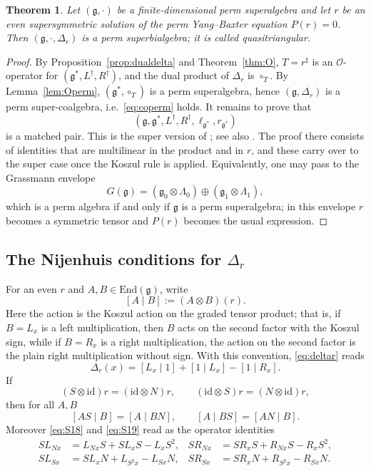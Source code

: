 \documentclass[11pt]{article}
\newtheorem{theorem}{Theorem}[section]
\theoremstyle{definition}
\newcommand{\g}{\mathfrak{g}}
\newcommand{\id}{\mathrm{id}}
\newcommand{\End}{\mathrm{End}}
\begin{document}
\begin{theorem}\label{thm:coboundary}
Let $(\g,\cdot)$ be a finite-dimensional perm superalgebra and let $r$ be an even supersymmetric solution of the perm Yang--Baxter equation $P(r)=0$. Then $(\g,\cdot,\Delta_r)$ is a perm superbialgebra; it is called \emph{quasitriangular}.
\end{theorem}
\begin{proof}
By Proposition~\ref{prop:dualdelta} and Theorem~\ref{thm:O}, $T=r^\sharp$ is an $\mathcal O$-operator for $(\g^*,L^\dagger,R^\dagger)$, and the dual product of $\Delta_r$ is $\circ_T$. By Lemma~\ref{lem:Operm}, $(\g^*,\circ_T)$ is a perm superalgebra, hence $(\g,\Delta_r)$ is a perm super-coalgebra, i.e.\ \eqref{eq:coperm} holds. It remains to prove that
\[
(\g,\g^*,L^\dagger,R^\dagger,\ell_{\g^*},r_{\g^*})
\]
is a matched pair. This is the super version of \cite[Cor.~4.15]{Hou}; see also \cite{MS}. The proof there consists of identities that are multilinear in the product and in $r$, and these carry over to the super case once the Koszul rule is applied. Equivalently, one may pass to the Grassmann envelope
\[
G(\g)=(\g_0\otimes\Lambda_0)\oplus(\g_1\otimes\Lambda_1),
\]
which is a perm algebra if and only if $\g$ is a perm superalgebra; in this envelope $r$ becomes a symmetric tensor and $P(r)$ becomes the usual expression.
\end{proof}

\subsection{The Nijenhuis conditions for $\Delta_r$}

For an even $r$ and $A,B\in\End(\g)$, write
\[
[A\mid B]:=(A\otimes B)(r).
\]
Here the action is the Koszul action on the graded tensor product; that is, if $B=L_x$ is a left multiplication, then $B$ acts on the second factor with the Koszul sign, while if $B=R_x$ is a right multiplication, the action on the second factor is the plain right multiplication without sign. With this convention, \eqref{eq:deltar} reads
\[
\Delta_r(x)=[L_x\mid 1]+[1\mid L_x]-[1\mid R_x].
\]
If
\[
(S\otimes\id)r=(\id\otimes N)r,
\qquad
(\id\otimes S)r=(N\otimes\id)r,
\]
then for all $A,B$
\begin{equation}\label{eq:rules}
[AS\mid B]=[A\mid BN],
\qquad
[A\mid BS]=[AN\mid B].
\end{equation}
Moreover \eqref{eq:S18} and \eqref{eq:S19} read as the operator identities
\begin{align}
SL_{Nx}&=L_{Nx}S+SL_xS-L_xS^2,
& SR_{Nx}&=SR_xS+R_{Nx}S-R_xS^2,\label{eq:op1}\\
SL_{Sx}&=SL_xN+L_{S^2x}-L_{Sx}N,
& SR_{Sx}&=SR_xN+R_{S^2x}-R_{Sx}N.\label{eq:op2}
\end{align}
\end{document}
